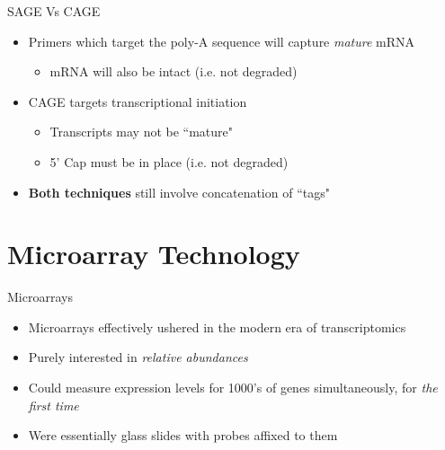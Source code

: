 \documentclass[aspectratio=169,11pt]{beamer}
\begin{document}
\begin{frame}{SAGE Vs CAGE}

	\begin{itemize}
		\item Primers which target the poly-A sequence will capture \textit{mature} mRNA
		\begin{itemize}
			\item mRNA will also be intact (i.e. not degraded)
		\end{itemize}
		\item CAGE targets transcriptional initiation
		\begin{itemize}
			\item Transcripts may not be ``mature"
			\item 5' Cap must be in place (i.e. not degraded)
		\end{itemize}
		\item \textbf{Both techniques} still involve concatenation of ``tags"
	\end{itemize}

\end{frame}

\section{Microarray Technology}

\begin{frame}{Microarrays}

	\begin{itemize}
		\item Microarrays effectively ushered in the modern era of transcriptomics
		\item Purely interested in \textit{relative abundances}
		\item Could measure expression levels for 1000’s of genes simultaneously, for \textit{the first time}		
		\item Were essentially glass slides with probes affixed to them
	\end{itemize}

\end{frame}
\end{document}

